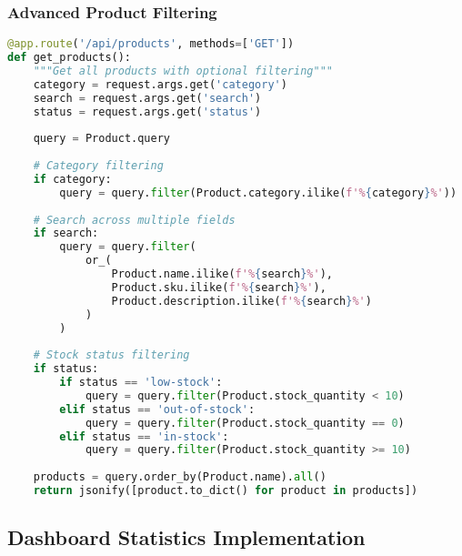 \documentclass[12pt,a4paper]{article}
\begin{document}
\subsubsection{Advanced Product Filtering}

\begin{lstlisting}[language=Python, caption=Product Filtering Implementation]
@app.route('/api/products', methods=['GET'])
def get_products():
    """Get all products with optional filtering"""
    category = request.args.get('category')
    search = request.args.get('search')
    status = request.args.get('status')
    
    query = Product.query
    
    # Category filtering
    if category:
        query = query.filter(Product.category.ilike(f'%{category}%'))
    
    # Search across multiple fields
    if search:
        query = query.filter(
            or_(
                Product.name.ilike(f'%{search}%'),
                Product.sku.ilike(f'%{search}%'),
                Product.description.ilike(f'%{search}%')
            )
        )
    
    # Stock status filtering
    if status:
        if status == 'low-stock':
            query = query.filter(Product.stock_quantity < 10)
        elif status == 'out-of-stock':
            query = query.filter(Product.stock_quantity == 0)
        elif status == 'in-stock':
            query = query.filter(Product.stock_quantity >= 10)
    
    products = query.order_by(Product.name).all()
    return jsonify([product.to_dict() for product in products])
\end{lstlisting}

\subsection{Dashboard Statistics Implementation}
\end{document}
